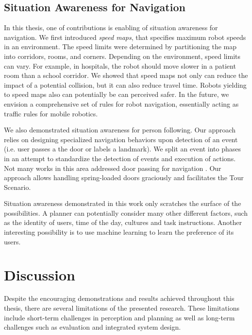 \subsection{Situation Awareness for Navigation}

In this thesis, one of contributions is enabling of situation awareness for navigation. We first introduced \textit{speed maps}, that specifies maximum robot speeds in an environment. The speed limits were determined by partitioning the map into corridors, rooms, and corners. Depending on the environment, speed limits can vary. For example, in hospitals, the robot should move slower in a patient room than a school corridor. We showed that speed maps not only can reduce the impact of a potential collision, but it can also reduce travel time. Robots yielding to speed maps also can potentially be can perceived safer. In the future, we envision a comprehensive set of rules for robot navigation, essentially acting as traffic rules for mobile robotics.

We also demonstrated situation awareness for person following. Our approach relies on designing specialized navigation behaviors upon detection of an event (i.e. user passes a the door or labels a landmark). We split an event into phases in an attempt to standardize the detection of events and execution of actions. Not many works in this area addressed door passing for navigation \cite{zender2007integrated}. Our approach allows handling spring-loaded doors graciously and facilitates the Tour Scenario.

Situation awareness demonstrated in this work only scratches the surface of the possibilities. A planner can potentially consider many other different factors, such as the identity of users, time of the day, cultures and task instructions. Another interesting possibility is to use machine learning to learn the preference of its users.


\section{Discussion}

Despite the encouraging demonstrations and results achieved throughout this thesis, there are several limitations of the presented research. These limitations include short-term challenges in perception and planning as well as long-term challenges such as evaluation and integrated system design. 

